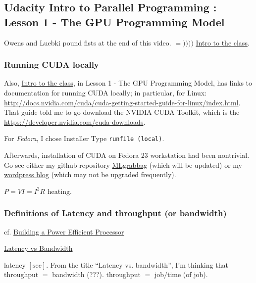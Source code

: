\documentclass[10pt]{amsart}
\begin{document}
\begin{multicols*}{2}
\subsection{Udacity Intro to Parallel Programming : Lesson 1 - The GPU Programming Model}

Owens and Luebki pound fists at the end of this video.  $=))))$  \href{https://classroom.udacity.com/courses/cs344/lessons/55120467/concepts/658304810923}{Intro to the class}.

\subsubsection{Running CUDA locally}
Also, \href{https://classroom.udacity.com/courses/cs344/lessons/55120467/concepts/658304810923}{Intro to the class}, in Lesson 1 - The GPU Programming Model, has links to documentation for running CUDA locally; in particular, for Linux: \url{http://docs.nvidia.com/cuda/cuda-getting-started-guide-for-linux/index.html}.  That guide told me to go download the NVIDIA CUDA Toolkit, which is the \href{NVIDIA CUDA Developer Toolkit}{https://developer.nvidia.com/cuda-downloads}.  

For \emph{Fedora}, I chose Installer Type \verb|runfile (local)|.  

Afterwards, installation of CUDA on Fedora 23 workstation had been nontrivial.  Go see either my github repository \href{https://github.com/ernestyalumni/MLgrabbag/blob/master/README.md}{MLgrabbag} (which will be updated) or my \href{https://ernestyalumni.wordpress.com/2016/05/07/fedora-23-workstation-linuxnvidia-geforce-gtx-980-ti-my-experience-log-of-what-i-do-and-find-out/#CUDAinstall}{wordpress blog} (which may not be upgraded frequently).  


$P=VI = I^2R$ heating.

\subsubsection{Definitions of Latency and throughput (or bandwidth)}

cf. 
\href{https://classroom.udacity.com/courses/cs344/lessons/55120467/concepts/669874580923}{Building a Power Efficient Processor}

\href{https://classroom.udacity.com/courses/cs344/lessons/55120467/concepts/667559300923}{Latency vs Bandwidth}

latency $[\text{sec}]$.  From the title ``Latency vs. bandwidth'', I'm thinking that throughput $=$ bandwidth (???).  throughput $ = $ job$/$time (of job).  


\end{multicols*}
\end{document}
